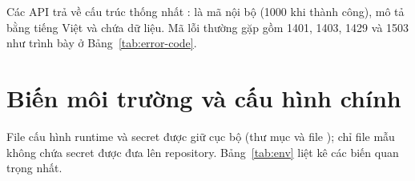 \begin{notebox}
Các API trả về cấu trúc thống nhất :  là mã nội bộ (1000 khi thành công),  mô tả bằng tiếng Việt và  chứa dữ liệu. Mã lỗi thường gặp gồm 1401, 1403, 1429 và 1503 như trình bày ở Bảng~\ref{tab:error-code}.
\end{notebox}

\section{Biến môi trường và cấu hình chính}
\label{sec:bien-moi-truong}

File cấu hình runtime và secret được giữ cục bộ (thư mục  và file ); chỉ file mẫu không chứa secret được đưa lên repository. Bảng~\ref{tab:env} liệt kê các biến quan trọng nhất.

